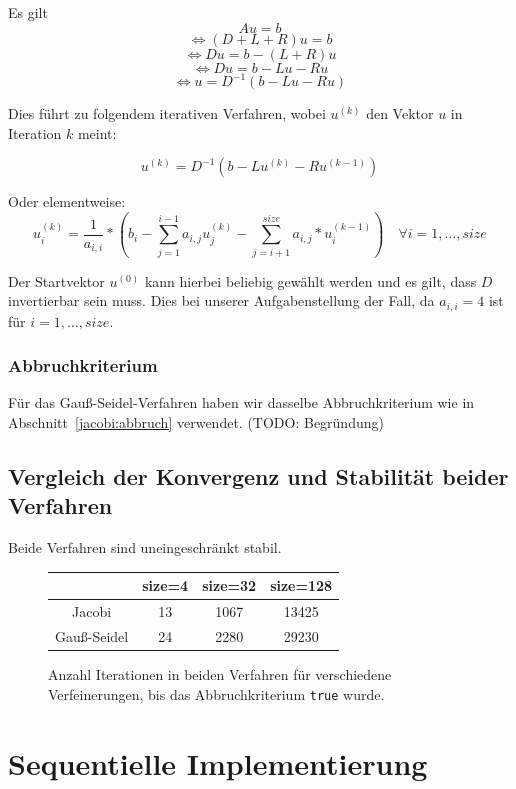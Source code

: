 \documentclass{article}
\begin{document}
Es gilt
$$Au = b$$
$$\Leftrightarrow (D+L+R)u = b$$
$$\Leftrightarrow Du = b - (L+R)u$$
$$\Leftrightarrow Du= b - Lu - Ru$$
$$\Leftrightarrow u = D^{-1} (b - Lu - Ru)$$

Dies führt zu folgendem iterativen Verfahren, wobei $u^{(k)}$ den Vektor $u$ in Iteration $k$ meint:

$$u^{(k)} = D^{-1} \left(b - Lu^{(k)} - Ru^{(k-1)}\right)$$

Oder elementweise:
$$u_i^{(k)} = \frac{1}{a_{i,i}} * \left(b_i - \sum_{j=1}^{i-1}{a_{i,j} u_j^{(k)}} - \sum_{j=i+1}^{size}{a_{i,j}*u_i^{(k-1)}}\right) \quad \forall i = 1, \ldots, size$$

Der Startvektor $u^{(0)}$ kann hierbei beliebig gewählt werden und es gilt, dass $D$ invertierbar sein muss. Dies bei unserer Aufgabenstellung der Fall, da $a_{i,i} = 4$ ist für $i = 1, \ldots, size$.



\subsubsection{Abbruchkriterium}
Für das Gauß-Seidel-Verfahren haben wir dasselbe Abbruchkriterium wie in Abschnitt~\ref{jacobi:abbruch} verwendet. (TODO: Begründung)

\subsection{Vergleich der Konvergenz und Stabilität beider Verfahren}\label{konvergenz}
Beide Verfahren sind uneingeschränkt stabil.
\begin{figure}[htbp] 
  \centering

  \begin{tabular}{|c|c|c|c|}
    \hline 
     & size=4 & size=32 & size=128 \\ 
    \hline 
    Jacobi & 13 & 1067 & 13425 \\ 
    \hline 
    Gauß-Seidel & 24 & 2280 & 29230 \\ 
    \hline 
    \end{tabular}   
  
  \caption{Anzahl Iterationen in beiden Verfahren für verschiedene Verfeinerungen, bis das Abbruchkriterium \texttt{true} wurde.}
  \label{fig:Bild1}
\end{figure}

\section{Sequentielle Implementierung}
\end{document}
